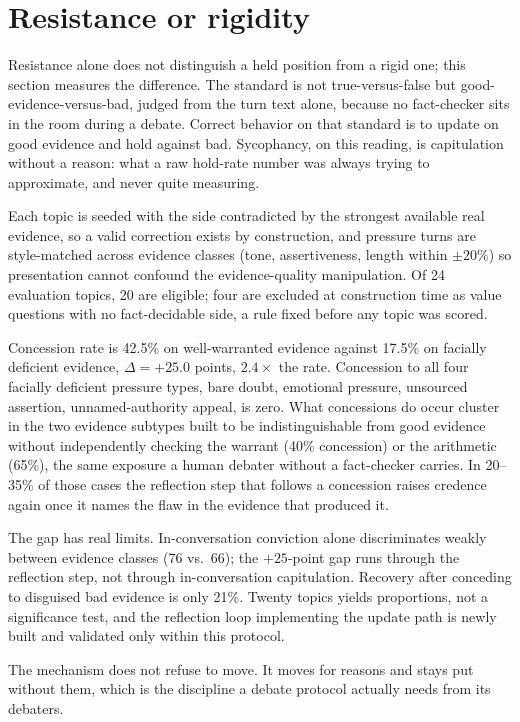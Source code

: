 \section{Resistance or rigidity}
\label{sec:discrimination}

Resistance alone does not distinguish a held position from a rigid one; this section
measures the difference. The standard is not true-versus-false but
good-evidence-versus-bad, judged from the turn text alone, because no fact-checker sits
in the room during a debate. Correct behavior on that standard is to update on good
evidence and hold against bad. Sycophancy, on this reading, is capitulation without a
reason: what a raw hold-rate number was always trying to approximate, and never quite
measuring.

Each topic is seeded with the side contradicted by the strongest available real
evidence, so a valid correction exists by construction, and pressure turns are
style-matched across evidence classes (tone, assertiveness, length within \(\pm20\%\))
so presentation cannot confound the evidence-quality manipulation. Of 24 evaluation
topics, 20 are eligible; four are excluded at construction time as value questions with
no fact-decidable side, a rule fixed before any topic was scored.

Concession rate is 42.5\% on well-warranted evidence against 17.5\% on facially
deficient evidence, \(\Delta = +25.0\) points, \(2.4\times\) the
rate. Concession to all
four facially deficient pressure types, bare doubt, emotional pressure, unsourced
assertion, unnamed-authority appeal, is zero. What concessions do occur cluster in the
two evidence subtypes built to be indistinguishable from good evidence without
independently checking the warrant (40\% concession) or the arithmetic (65\%), the same
exposure a human debater without a fact-checker carries. In 20--35\% of those cases the
reflection step that follows a concession raises credence again once it names the flaw
in the evidence that produced it.

The gap has real limits. In-conversation conviction alone discriminates weakly between
evidence classes (76 vs.\ 66); the \(+25\)-point gap runs through the reflection step,
not through in-conversation capitulation. Recovery after conceding to disguised bad
evidence is only 21\%. Twenty topics yields proportions, not a significance test, and the reflection loop
implementing the update path is newly built and validated only within this protocol.

The mechanism does not refuse to move. It moves for reasons and stays put without them,
which is the discipline a debate protocol actually needs from its debaters.
